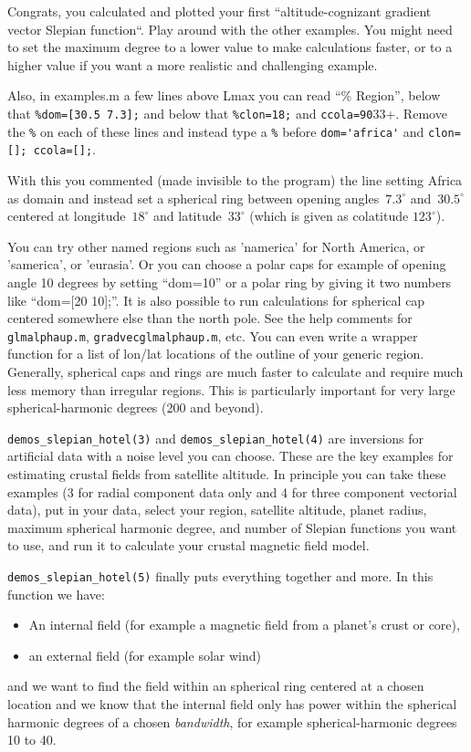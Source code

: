 \documentclass[11pt]{article}
\begin{document}
Congrats, you calculated and plotted your first ``altitude-cognizant
gradient vector Slepian function``. Play around with the other
examples. You might need to set the maximum degree to a lower value to
make calculations faster, or to a higher value if you want a more
realistic and challenging example.

Also, in examples.m a few lines above Lmax you can read ``\% Region'',
below that \verb+%dom=[30.5 7.3];+ and below that \verb+%clon=18;+ and
\verb+ccola=90+33+. Remove the \verb+%+ on each of these lines and
instead type a \verb+%+ before \verb+dom='africa'+ and
\verb+clon=[]; ccola=[];+.

With this you commented (made invisible to the program) the line
setting Africa as domain and instead set a spherical ring between
opening angles~$7.3^\circ$ and~$30.5^\circ$ centered at
longitude~$18^\circ$ and latitude~$33^\circ$ (which is given as
colatitude $123^\circ$).

You can try other named regions such as 'namerica' for North America,
or 'samerica', or 'eurasia'. Or you can choose a polar caps for
example of opening angle 10 degrees by setting ``dom=10'' or a polar
ring by giving it two numbers like ``dom=[20 10];''. It is also
possible to run calculations for spherical cap centered somewhere else
than the north pole. See the help comments for \verb+glmalphaup.m+,
\verb+gradvecglmalphaup.m+, etc. You can even write a wrapper function
for a list of lon/lat locations of the outline of your generic
region. Generally, spherical caps and rings are much faster to
calculate and require much less memory than irregular regions. This is
particularly important for very large spherical-harmonic degrees (200
and beyond).

\verb+demos_slepian_hotel(3)+ and \verb+demos_slepian_hotel(4)+ are inversions for
artificial data with a noise level you can choose. These are the key
examples for estimating crustal fields from satellite altitude. In
principle you can take these examples (3 for radial component data
only and 4 for three component vectorial data), put in your data,
select your region, satellite altitude, planet radius, maximum
spherical harmonic degree, and number of Slepian functions you want to
use, and run it to calculate your crustal magnetic field model.

\verb+demos_slepian_hotel(5)+ finally puts everything together and
more. In this function we have:

\begin{itemize}
  \item An internal field (for example a
    magnetic field from a planet's crust or core),
  \item an external field (for example solar wind)
\end{itemize}
and we want to find the field within an spherical ring centered at a
chosen location and we know that the internal field only has power
within the spherical harmonic degrees of a chosen \emph{bandwidth},
for example spherical-harmonic degrees 10 to 40.
\end{document}
